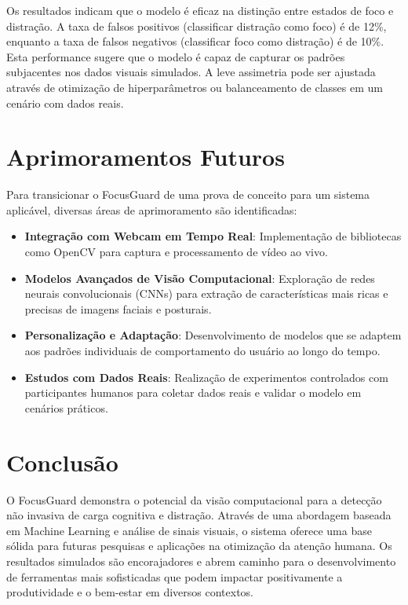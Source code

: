 \documentclass{article}
\begin{document}
Os resultados indicam que o modelo é eficaz na distinção entre estados de foco e distração. A taxa de falsos positivos (classificar distração como foco) é de 12\%, enquanto a taxa de falsos negativos (classificar foco como distração) é de 10\%. Esta performance sugere que o modelo é capaz de capturar os padrões subjacentes nos dados visuais simulados. A leve assimetria pode ser ajustada através de otimização de hiperparâmetros ou balanceamento de classes em um cenário com dados reais.

\section{Aprimoramentos Futuros}

Para transicionar o FocusGuard de uma prova de conceito para um sistema aplicável, diversas áreas de aprimoramento são identificadas:
\begin{itemize}
    \item \textbf{Integração com Webcam em Tempo Real}: Implementação de bibliotecas como OpenCV para captura e processamento de vídeo ao vivo.
    \item \textbf{Modelos Avançados de Visão Computacional}: Exploração de redes neurais convolucionais (CNNs) para extração de características mais ricas e precisas de imagens faciais e posturais.
    \item \textbf{Personalização e Adaptação}: Desenvolvimento de modelos que se adaptem aos padrões individuais de comportamento do usuário ao longo do tempo.
    \item \textbf{Estudos com Dados Reais}: Realização de experimentos controlados com participantes humanos para coletar dados reais e validar o modelo em cenários práticos.
\end{itemize}

\section{Conclusão}

O FocusGuard demonstra o potencial da visão computacional para a detecção não invasiva de carga cognitiva e distração. Através de uma abordagem baseada em Machine Learning e análise de sinais visuais, o sistema oferece uma base sólida para futuras pesquisas e aplicações na otimização da atenção humana. Os resultados simulados são encorajadores e abrem caminho para o desenvolvimento de ferramentas mais sofisticadas que podem impactar positivamente a produtividade e o bem-estar em diversos contextos.
\end{document}
